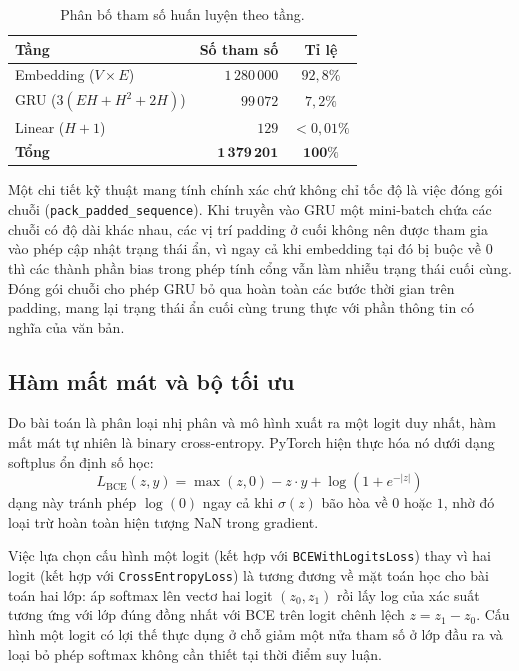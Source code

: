 \begin{table}[htbp]
\centering
\caption{Phân bố tham số huấn luyện theo tầng.}
\label{tab:phan-bo-tham-so}
\begin{tabular}{lrc}
\toprule
\textbf{Tầng} & \textbf{Số tham số} & \textbf{Tỉ lệ} \\ \midrule
Embedding ($V \times E$) & $1\,280\,000$ & $92,8\%$ \\
GRU ($3(EH + H^2 + 2H)$) & $99\,072$     & $7,2\%$  \\
Linear ($H + 1$)         & $129$         & $< 0,01\%$ \\ \midrule
\textbf{Tổng}            & $\mathbf{1\,379\,201}$ & $\mathbf{100\%}$ \\ \bottomrule
\end{tabular}
\end{table}

Một chi tiết kỹ thuật mang tính chính xác chứ không chỉ tốc độ là việc đóng gói chuỗi (\texttt{pack\_padded\_sequence}). Khi truyền vào GRU một mini-batch chứa các chuỗi có độ dài khác nhau, các vị trí padding ở cuối không nên được tham gia vào phép cập nhật trạng thái ẩn, vì ngay cả khi embedding tại đó bị buộc về $0$ thì các thành phần bias trong phép tính cổng vẫn làm nhiễu trạng thái cuối cùng. Đóng gói chuỗi cho phép GRU bỏ qua hoàn toàn các bước thời gian trên padding, mang lại trạng thái ẩn cuối cùng trung thực với phần thông tin có nghĩa của văn bản.

\subsection{Hàm mất mát và bộ tối ưu}

Do bài toán là phân loại nhị phân và mô hình xuất ra một logit duy nhất, hàm mất mát tự nhiên là binary cross-entropy. PyTorch hiện thực hóa nó dưới dạng softplus ổn định số học:
\begin{equation}
L_{\text{BCE}}(z, y) = \max(z, 0) - z \cdot y + \log(1 + e^{-|z|})
\end{equation}
dạng này tránh phép $\log(0)$ ngay cả khi $\sigma(z)$ bão hòa về $0$ hoặc $1$, nhờ đó loại trừ hoàn toàn hiện tượng NaN trong gradient.

Việc lựa chọn cấu hình một logit (kết hợp với \texttt{BCEWithLogitsLoss}) thay vì hai logit (kết hợp với \texttt{CrossEntropyLoss}) là tương đương về mặt toán học cho bài toán hai lớp: áp softmax lên vectơ hai logit $(z_0, z_1)$ rồi lấy log của xác suất tương ứng với lớp đúng đồng nhất với BCE trên logit chênh lệch $z = z_1 - z_0$. Cấu hình một logit có lợi thế thực dụng ở chỗ giảm một nửa tham số ở lớp đầu ra và loại bỏ phép softmax không cần thiết tại thời điểm suy luận.


